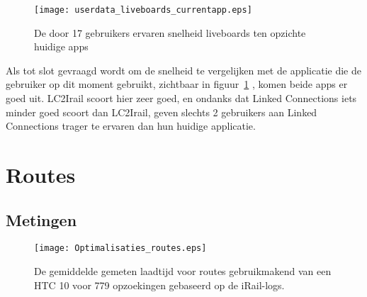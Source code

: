 \begin{figure}[ht]
	\centering
	\texttt{[image: userdata\_liveboards\_currentapp.eps]}
	\caption[Door gebruikers ervaren snelheid liveboards tov huidige apps]{De door 17 gebruikers ervaren snelheid liveboards ten opzichte huidige apps }
	\label{fig:relativePerceptionLiveboards}
\end{figure}

Als tot slot gevraagd wordt om de snelheid te vergelijken met de applicatie die de gebruiker op dit moment gebruikt, zichtbaar in figuur~\ref{fig:relativePerceptionLiveboards} , komen beide apps er goed uit. LC2Irail scoort hier zeer goed, en ondanks dat Linked Connections iets minder goed scoort dan LC2Irail, geven slechts 2 gebruikers aan Linked Connections trager te ervaren dan hun huidige applicatie.

\section{Routes}

\subsection{Metingen}
\begin{figure}[h]
	\centering
	\texttt{[image: Optimalisaties\_routes.eps]}
	\caption[Gemeten laadtijd routes bij verschillende implementatiedetails]{De gemiddelde gemeten laadtijd voor routes gebruikmakend van een HTC 10 voor 779 opzoekingen gebaseerd op de iRail-logs.}
	\label{fig:routelabtest}
\end{figure}
%		

